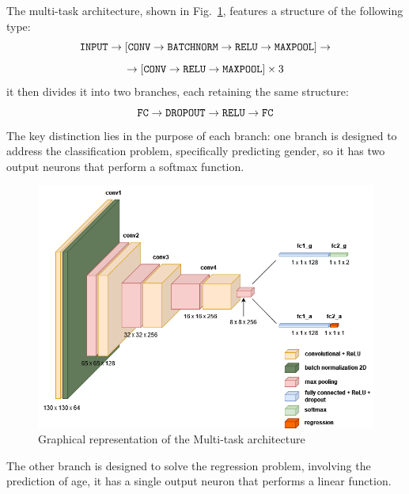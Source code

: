 The multi-task architecture, shown in Fig.~\ref{cnn1},
features a structure of the following type:
$$ \text{\texttt{INPUT}} \rightarrow [\text{\texttt{CONV}} \rightarrow \text{\texttt{BATCHNORM}} \rightarrow \text{\texttt{RELU}} \rightarrow \text{\texttt{MAXPOOL}}] \rightarrow $$
$$\rightarrow [\text{\texttt{CONV}} \rightarrow \text{\texttt{RELU}} \rightarrow \text{\texttt{MAXPOOL}}]\times 3$$
it then divides it into two branches, each retaining the same structure:
$$ \text{\texttt{FC}} \rightarrow \text{\texttt{DROPOUT}} \rightarrow \text{\texttt{RELU}} \rightarrow \text{\texttt{FC}}$$
The key distinction lies in the purpose of each branch:
one branch is designed to address the classification problem,
specifically predicting gender,
so it has two output neurons that perform a softmax function.
\begin{figure}[htbp]
    \centerline{\includegraphics[width=.5\textwidth]{images/shared_cnn.png}}
    \caption{Graphical representation of the Multi-task architecture}
    \label{cnn1}
\end{figure}
The other branch is designed to solve the regression problem,
involving the prediction of age,
it has a single output neuron that performs a linear function.

